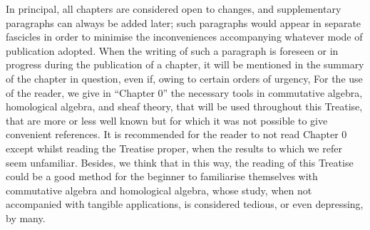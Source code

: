 \bigskip

In principal, all chapters are considered open to changes, and supplementary
paragraphs can always be added later; such paragraphs would appear in separate
fascicles in order to minimise the inconveniences accompanying whatever mode of
publication adopted. When the writing of such a paragraph is foreseen or in
progress during the publication of a chapter, it will be mentioned in the
summary of the chapter in question, even if, owing to certain orders of urgency,
 For the use of
the reader, we give in ``Chapter 0'' the necessary tools in commutative algebra,
homological algebra, and sheaf theory, that will be used throughout this
Treatise, that are more or less well known but for which it was not possible to
give convenient references. It is recommended for the reader to not read
Chapter 0 except whilst reading the Treatise proper, when the results to which
we refer seem unfamiliar. Besides, we think that in this way, the
reading of this Treatise could be a good method for the beginner to familiarise
themselves with commutative algebra and homological algebra, whose study, when
not accompanied with tangible applications, is considered tedious, or even
depressing, by many.

\asttri

